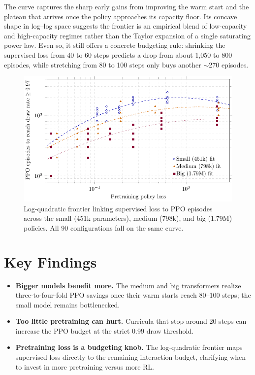 \documentclass[11pt]{article}
\begin{document}
The curve captures the sharp early gains from improving the warm start and the plateau that arrives once the policy approaches its capacity floor. Its concave shape in log--log space suggests the frontier is an empirical blend of low-capacity and high-capacity regimes rather than the Taylor expansion of a single saturating power law. Even so, it still offers a concrete budgeting rule: shrinking the supervised loss from 40 to 60 steps predicts a drop from about 1{,}050 to 800 episodes, while stretching from 80 to 100 steps only buys another $\sim$270 episodes.

\begin{figure}[H]
    \centering
    \includegraphics[width=0.75\linewidth]{warm-start-loss-frontier.pdf}
    \caption{Log-quadratic frontier linking supervised loss to PPO episodes across the small (451k parameters), medium (798k), and big (1.79M) policies. All 90 configurations fall on the same curve.}
    \label{fig:logquadratic}
\end{figure}

\section{Key Findings}
\begin{itemize}
    \item \textbf{Bigger models benefit more.} The medium and big transformers realize three-to-four-fold PPO savings once their warm starts reach 80--100 steps; the small model remains bottlenecked.
    \item \textbf{Too little pretraining can hurt.} Curricula that stop around 20 steps can increase the PPO budget at the strict 0.99 draw threshold.
    \item \textbf{Pretraining loss is a budgeting knob.} The log-quadratic frontier maps supervised loss directly to the remaining interaction budget, clarifying when to invest in more pretraining versus more RL.
\end{itemize}
\end{document}
